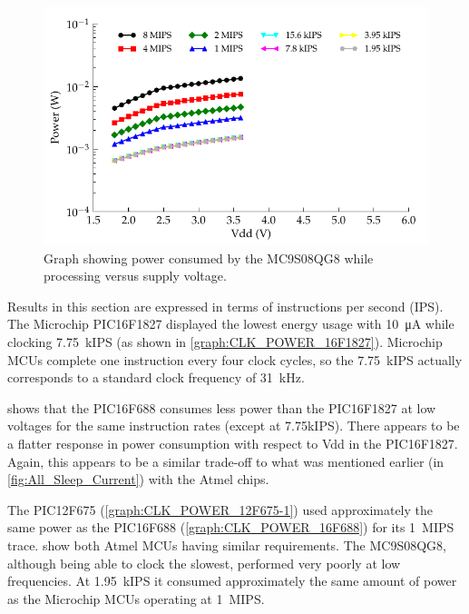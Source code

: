       \begin{figure}
        \centering
        \includegraphics{content/pt1/03-EnergyRequirements/graphics/Graph_MC9S08QG8_Clock_Power}
        \caption{\label{graph:CLK_POWER_MC9S08QG8}Graph showing power consumed by the MC9S08QG8 while processing versus supply voltage.}
      \end{figure}

      Results in this section are expressed in terms of instructions per second (IPS).
      The Microchip PIC16F1827 displayed the lowest energy usage with \SI{10}{\micro\ampere} while clocking \SI{7.75}{\kilo IPS} (as shown in \cref{graph:CLK_POWER_16F1827}).
      Microchip MCUs complete one instruction every four clock cycles, so the \SI{7.75}{\kilo IPS} actually corresponds to a standard clock frequency of \SI{31}{\kilo\hertz}.


       shows that the PIC16F688 consumes less power than the PIC16F1827 at low voltages for the same instruction rates (except at 7.75kIPS).
      There appears to be a flatter response in power consumption with respect to Vdd in the PIC16F1827.
      Again, this appears to be a similar trade-off to what was mentioned earlier (in \cref{fig:All_Sleep_Current}) with the Atmel chips.

      The PIC12F675 (\cref{graph:CLK_POWER_12F675-1}) used approximately the same power as the PIC16F688 (\cref{graph:CLK_POWER_16F688}) for its \SI{1}{\mega IPS} trace.
       show both Atmel MCUs having similar requirements.
      The MC9S08QG8, although being able to clock the slowest, performed very poorly at low frequencies.
      At \SI{1.95}{\kilo IPS} it consumed approximately the same amount of power as the Microchip MCUs operating at \SI{1}{\mega IPS}.

